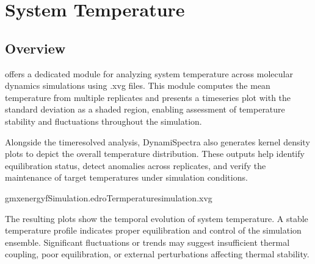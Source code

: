\documentclass[a4paper,10pt,english]{sphinxmanual}
\begin{document}
\sphinxstepscope


\chapter{System Temperature}
\label{\detokenize{Temperature:system-temperature}}\label{\detokenize{Temperature::doc}}

\section{Overview}
\label{\detokenize{Temperature:overview}}
\sphinxAtStartPar
{} offers a dedicated module for analyzing system temperature across molecular dynamics simulations using .xvg files. This module computes the mean temperature from multiple replicates and presents a time\sphinxhyphen{}series plot with the standard deviation as a shaded region, enabling assessment of temperature stability and fluctuations throughout the simulation.

\sphinxAtStartPar
Alongside the time\sphinxhyphen{}resolved analysis, DynamiSpectra also generates kernel density plots to depict the overall temperature distribution. These outputs help identify equilibration status, detect anomalies across replicates, and verify the maintenance of target temperatures under simulation conditions.

\sphinxAtStartPar
{}

\begin{sphinxVerbatim}[commandchars=\\\{\}]
gmxenergy\PYGZhy{}fSimulation.edr\PYGZhy{}oTermperature\PYGZus{}simulation.xvg
\end{sphinxVerbatim}

\begin{sphinxVerbatim}[commandchars=\\\{\}]
   
\end{sphinxVerbatim}

\noindent{}

\sphinxAtStartPar
{} The resulting plots show the temporal evolution of system temperature. A stable temperature profile indicates proper equilibration and control of the simulation ensemble. Significant fluctuations or trends may suggest insufficient thermal coupling, poor equilibration, or external perturbations affecting thermal stability.
\end{document}
